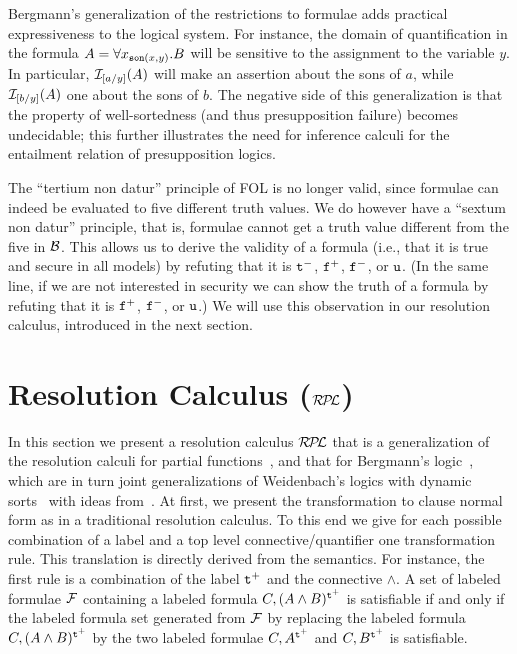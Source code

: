 \documentclass{\filespath jancl}
\newcommand{\undefined}{{\sf u}}
\newcommand{\twts}{{{\sf t}^+}}
\newcommand{\twfs}{{{\sf f}^+}}
\newcommand{\twti}{{{\sf t}^-}}
\newcommand{\twfi}{{{\sf f}^-}}
\def\presuppres{{\cal R\kern-.3ex P\kern-.4ex L}}
\def\sf{\tt}
\begin{document}
\begin{remark}
  Bergmann's generalization of the restrictions to formulae adds practical
  expressiveness to the logical system. For instance, the domain of
  quantification in the formula $A=\forall x_{{\sf son}(x,y)}.B$  will be sensitive
  to the assignment to the variable $y$. In particular, ${\cal I}_{[a/y]}(A)$ will
  make an assertion about the sons of $a$, while ${\cal I}_{[b/y]}(A)$ one about the
  sons of $b$. The negative side of this generalization is that the property
  of well-sortedness (and thus presupposition failure) becomes undecidable;
  this further illustrates the need for inference calculi for the entailment
  relation of presupposition logics.
\end{remark}

\begin{remark}
  The ``tertium non datur'' principle of FOL is no longer valid, since formulae
  can indeed be evaluated to five different truth values.  We do however have a
  ``sextum non datur'' principle, that is, formulae cannot get a truth value
  different from the five in ${\cal B}$.  This allows us to derive the validity of a
  formula (i.e., that it is true and secure in all models) by refuting that it is
  $\twti$, $\twfs$, $\twfi$, or $\undefined$.  (In the same line, if we are not
  interested in security we can show the truth of a formula by refuting that it
  is $\twfs$, $\twfi$, or $\undefined$.)  We will use this observation in our
  resolution calculus, introduced in the next section.
\end{remark}


%
\section{Resolution Calculus ($\presuppres$)}\label{sec:presupplres} 

In this section we present a resolution calculus $\presuppres$ that is a generalization of
the resolution calculi for partial functions~\cite{KeKo94}, and that for Bergmann's
logic~\cite{KeKo:arcfp96}, which are in turn joint generalizations of Weidenbach's logics
with dynamic sorts~\cite{Weidenbach91} with ideas from~\cite{BaFe92,Haehnle:adimvl94}. At
first, we present the transformation to clause normal form as in a traditional resolution
calculus. To this end we give for each possible combination of a label and a top level
connective/quantifier one transformation rule. This translation is directly derived from
the semantics. For instance, the first rule is a combination of the label $\twts$ and the
connective $\land$. A set of labeled formulae ${\cal F}$ containing a labeled formula
$C,(A\land B)^\twts$ is satisfiable if and only if the labeled formula set generated from
${\cal F}$ by replacing the labeled formula $C,(A\land B)^\twts$ by the two labeled formulae
$C,A^\twts$ and $C,B^\twts$ is satisfiable.
\end{document}
